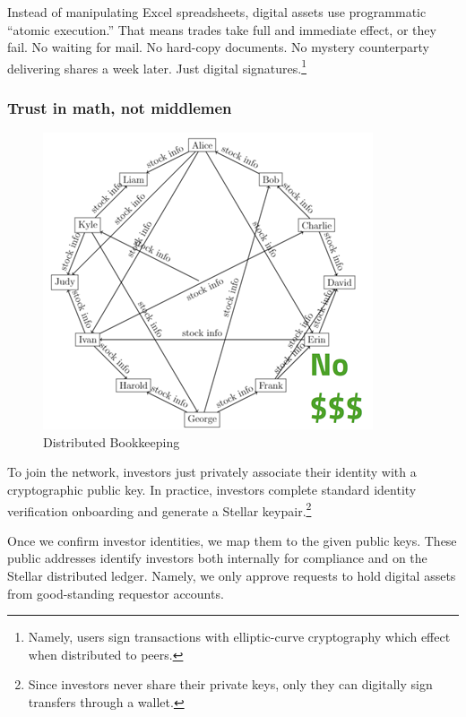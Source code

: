 \documentclass[11pt, english]{article}
\begin{document}
\begin{multicols}{2}
Instead of manipulating Excel spreadsheets, digital assets use programmatic ``atomic execution.'' That means trades take full and immediate effect, or they fail. No waiting for mail. No hard-copy documents. No mystery counterparty delivering shares a week later. Just digital signatures.\footnote{Namely, users sign transactions with elliptic-curve cryptography which effect when distributed to peers.}

\subsubsection{Trust in math, not middlemen}

\begin{figure}[H]
    \centering
    \includegraphics[width=\linewidth]{decentralized.png}
    \caption{Distributed Bookkeeping}
    \label{fig:decentralized}
\end{figure}

To join the network, investors just privately associate their identity with a cryptographic public key. In practice, investors complete standard identity verification onboarding and generate a Stellar keypair.\footnote{Since investors never share their private keys, only they can digitally sign transfers through a wallet.}

Once we confirm investor identities, we map them to the given public keys. These public addresses identify investors both internally for compliance and on the Stellar distributed ledger. Namely, we only approve requests to hold digital assets from good-standing requestor accounts.



\end{multicols}
\end{document}
